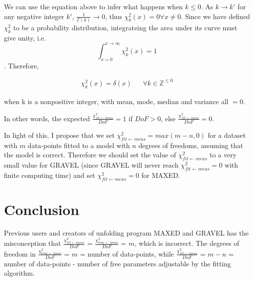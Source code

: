 \documentclass[a4paper, 12pt]{article}
\newcommand{\chifit}{\frac{\chi^2_{fit\leftarrow meas}}{DoF} }
\newcommand{\chitrue}{\frac{\chi^2_{true\leftarrow meas}}{DoF}}
\begin{document}
We can use the equation above to infer what happens when $k\leq0$. As $k\rightarrow k'$ for any negative integer $k'$, $\frac{1}{\Gamma(k)}\rightarrow0$, thus $\chi^2_k(x)=0 \forall x\neq0$. Since we have defined $\chi^2_k$ to be a probability distribution, integrateing the area under its curve must give unity, i.e.$$\int_{x=0}^{x\rightarrow\infty}\chi^2_k(x)=1$$. Therefore, 

\begin{align}    
\chi^2_k(x)=\delta(x) & & \forall k \in\mathbb{Z}^{\leq0}
\end{align}

when k is a nonpositive integer, with mean, mode, median and variance all $=0$.

In other words, the expected $\chifit=1$ if $DoF>0$, else $\chifit=0$.


In light of this, I propose that we set $\chi^2_{fit\leftarrow meas}=max(m-n,0)$ for a dataset with $m$ data-points fitted to a model with $n$ degrees of freedoms, assuming that the model is correct.
Therefore we should set the value of $\chi^2_{fit\leftarrow meas}$ to a very small value for GRAVEL (since GRAVEL will never reach $\chi^2_{fit\leftarrow meas}=0$ with finite computing time) and set $\chi^2_{fit\leftarrow meas}=0$ for MAXED.


% 
% 
\section{Conclusion}
Previous users and creators of unfolding program MAXED and GRAVEL has the misconception that $\chifit$ = $\chitrue$ = $m$, which is incorrect. The degrees of freedom in $\chitrue$ = $m$ = number of data-points, while $\chifit$ = $m-n$ = number of data-points - number of free parameters adjustable by the fitting algorithm.
\end{document}
